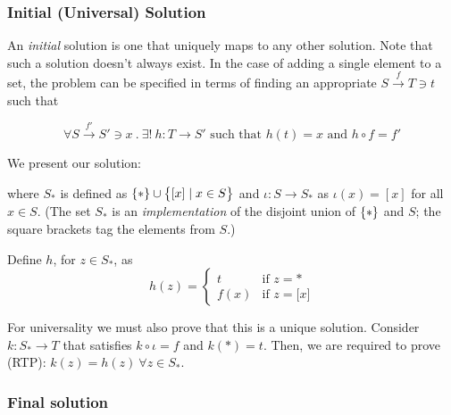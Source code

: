 \subsubsection*{Initial (Universal) Solution}

An \emph{initial} solution is one that uniquely maps to any other solution.
Note that such a solution doesn't always exist. In the case of adding a single
element to a set, the problem can be specified in terms of finding an
appropriate $S \overset{f}{\rightarrow} T \ni t$ such that

\begin{equation*}
  \forall S \overset{f'}{\rightarrow} S' \ni x \ .\ 
  \exists!\ h : T \rightarrow S' \text{ such that }
  h(t) = x \text{ and }
  h \circ f = f'
\end{equation*}

We present our solution:
\begin{center}
\end{center}

where $S_\ast$ is defined as 
$\{  \ast  \} \cup \big\{  \lbrack x\rbrack \mid x \in S  \big\}$
and $\iota: S \to S_\ast$ as $\iota(x)=[x]$ for all $x\in S$.  
%
(The set $S_\ast$ is an \emph{implementation} of the disjoint union of
$\{ * \}$ and $S$; the square brackets tag the elements from $S$.)

Define $h$, for $z\in S_\ast$, as
\begin{equation*}
    h(z) = \begin{cases}
        t & \text{if } z = \ast\\
        f(x) & \text{if } z = \lbrack x \rbrack 
    \end{cases}
\end{equation*}

For universality we must also prove that this is a unique solution.
Consider $k:S_\ast\to T$ that satisfies $k \circ \iota = f$ and 
$k(\ast) = t$. Then, we are required to prove (RTP):
$k(z) = h(z)\ \forall z \in S_\ast$.

\subsubsection*{Final solution}

